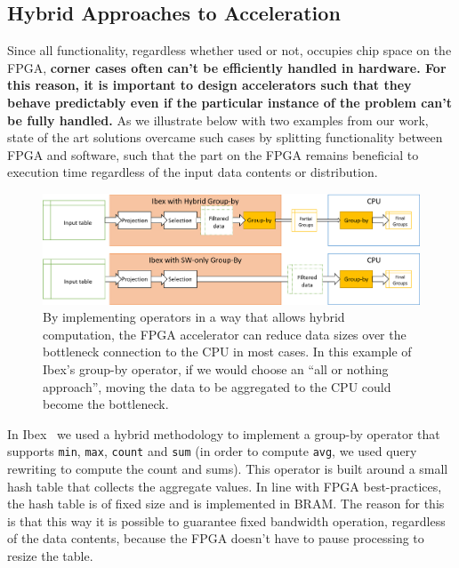 \documentclass[11pt]{article}
\begin{document}
\subsection{Hybrid Approaches to Acceleration}
\label{sec:hybrid-comp}

Since all functionality, regardless whether used or not, occupies chip space on the FPGA, \textbf{corner cases often can't be efficiently handled in hardware. For this reason, it is important to design accelerators such that they behave predictably even if the particular instance of the problem can't be fully handled.} As we illustrate below with two examples from our work, state of the art solutions overcame such cases by splitting functionality between FPGA and software, such that the part on the FPGA remains beneficial to execution time regardless of the input data contents or distribution. 


\begin{figure}[b]
\centering
\includegraphics[width=0.9\linewidth]{figs/hybrid-compute.png}
\caption{By implementing operators in a way that allows hybrid computation, the FPGA accelerator can reduce data sizes over the bottleneck connection to the CPU in most cases. In this example of Ibex's group-by operator, if we would choose an ``all or nothing approach'', moving the data to be aggregated to the CPU could become the bottleneck.\label{fig:hybrid-compute}}
\end{figure}


In Ibex~\cite{woods-Ibex-vldb14} we used a hybrid methodology to implement a group-by operator that supports \texttt{min}, \texttt{max}, \texttt{count} and \texttt{sum} (in order to compute \texttt{avg}, we used query rewriting to compute the count and sums). This operator is built around a small hash table that collects the aggregate values. In line with FPGA best-practices, the hash table is of fixed size and is implemented in BRAM. The reason for this is that this way it is possible to guarantee fixed bandwidth operation, regardless of the data contents, because the FPGA doesn't have to pause processing to resize the table. 
\end{document}
